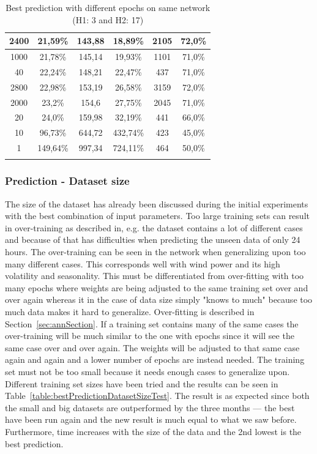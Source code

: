 \begin{center}
\begin{longtable}{|c|c|c|c|c|c|}
2400 & 21,59\% & 143,88 & 18,89\% & 2105 & 72,0\% \\ \hline
1000 & 21,78\% & 145,14 & 19,93\% & 1101 & 71,0\% \\ \hline
40 & 22,24\% & 148,21 & 22,47\% & 437 & 71,0\% \\ \hline
2800 & 22,98\% & 153,19 & 26,58\% & 3159 & 72,0\% \\ \hline
2000 & 23,2\% & 154,6 & 27,75\% & 2045 & 71,0\% \\ \hline
20 & 24,0\% & 159,98 & 32,19\% & 441 & 66,0\% \\ \hline
10 & 96,73\% & 644,72 & 432,74\% & 423 & 45,0\% \\ \hline
1 & 149,64\% & 997,34 & 724,11\% & 464 & 50,0\% \\ \hline
\caption{Best prediction with different epochs on same network (H1: 3 and H2: 17)}
\label{table:bestPredictionEpochExperiment}
\end{longtable}
\end{center}

\subsubsection{Prediction - Dataset size}
The size of the dataset has already been discussed during the initial experiments with the best combination of input parameters. Too large training sets can result in over-training as described in\cite{1}, e.g. the dataset contains a lot of different cases and because of that has difficulties when predicting the unseen data of only 24 hours. The over-training can be seen in the network when generalizing upon too many different cases. This corresponds well with wind power and its high volatility and seasonality. This must be differentiated from over-fitting with too many epochs where weights are being adjusted to the same training set over and over again whereas it in the case of data size simply "knows to much" because too much data makes it hard to generalize. Over-fitting is described in Section~\ref{sec:annSection}. If a training set contains many of the same cases the over-training will be much similar to the one with epochs since it will see the same case over and over again. The weights will be adjusted to that same case again and again and a lower number of epochs are instead needed. The training set must not be too small because it needs enough cases to generalize upon. Different training set sizes have been tried and the results can be seen in Table~\ref{table:bestPredictionDatasetSizeTest}. The result is as expected since both the small and big datasets are outperformed by the three months --- the best have been run again and the new result is much equal to what we saw before. Furthermore, time increases with the size of the data and the 2nd lowest is the best prediction.

